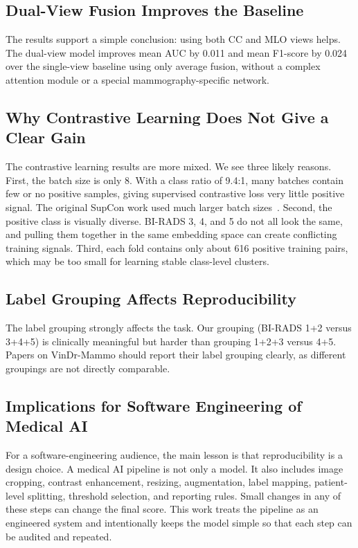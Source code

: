 \documentclass[runningheads]{llncs}
\begin{document}
\subsection{Dual-View Fusion Improves the Baseline}

The results support a simple conclusion: using both CC and MLO views helps. The dual-view model improves mean AUC by 0.011 and mean F1-score by 0.024 over the single-view baseline using only average fusion, without a complex attention module or a special mammography-specific network.

\subsection{Why Contrastive Learning Does Not Give a Clear Gain}

The contrastive learning results are more mixed. We see three likely reasons. First, the batch size is only 8. With a class ratio of 9.4:1, many batches contain few or no positive samples, giving supervised contrastive loss very little positive signal. The original SupCon work used much larger batch sizes~\cite{khosla2020supcon}. Second, the positive class is visually diverse. BI-RADS 3, 4, and 5 do not all look the same, and pulling them together in the same embedding space can create conflicting training signals. Third, each fold contains only about 616 positive training pairs, which may be too small for learning stable class-level clusters.

\subsection{Label Grouping Affects Reproducibility}

The label grouping strongly affects the task. Our grouping (BI-RADS 1+2 versus 3+4+5) is clinically meaningful but harder than grouping 1+2+3 versus 4+5. Papers on VinDr-Mammo should report their label grouping clearly, as different groupings are not directly comparable.

\subsection{Implications for Software Engineering of Medical AI}

For a software-engineering audience, the main lesson is that reproducibility is a design choice. A medical AI pipeline is not only a model. It also includes image cropping, contrast enhancement, resizing, augmentation, label mapping, patient-level splitting, threshold selection, and reporting rules. Small changes in any of these steps can change the final score. This work treats the pipeline as an engineered system and intentionally keeps the model simple so that each step can be audited and repeated.
\end{document}
